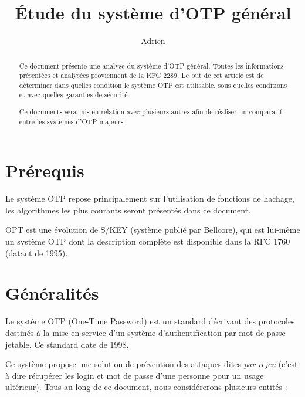 \documentclass{../res/univ-projet}
\title{\'Etude du syst\`eme d'OTP g\'en\'eral}
\author{Adrien \bsc{Smondack}}
\begin{document}
\maketitle

\begin{abstract}
  Ce document présente une analyse du système d'OTP général. Toutes les informations présentées et analysées proviennent de la RFC 2289. Le but de cet article est de déterminer dans quelles condition le système OTP est utilisable, sous quelles conditions et avec quelles garanties de sécurité.
  
  Ce documents sera mis en relation avec plusieurs autres afin de réaliser un comparatif entre les systèmes d'OTP majeurs.
\end{abstract}
\newpage
\tableofcontents
\newpage

\section{Prérequis}
  Le système OTP repose principalement sur l'utilisation de fonctions de hachage, les algorithmes les plus courants seront présentés dans ce document.

  OPT est une évolution de S/KEY (système publié par Bellcore), qui est lui-même un système OTP dont la description complète est disponible dans la RFC 1760 (datant de 1995).

\section{Généralités}
  Le système OTP (One-Time Password) est un standard décrivant des protocoles destinés à la mise en service d'un système d'authentification par mot de passe jetable. Ce standard date de 1998.

  Ce système propose une solution de prévention des attaques dites \emph{par rejeu} (c'est à dire récupérer les login et mot de passe d'une personne pour un usage ultérieur). Tous au long de ce document, nous considérerons plusieurs entités :
\end{document}
